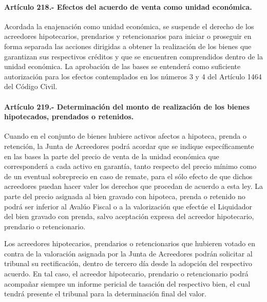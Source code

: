 \documentclass[
]{book}
\begin{document}
\hypertarget{artuxedculo-218.--efectos-del-acuerdo-de-venta-como-unidad-econuxf3mica.}{%
\paragraph*{Artículo 218.- Efectos del acuerdo de venta como unidad económica.}\label{artuxedculo-218.--efectos-del-acuerdo-de-venta-como-unidad-econuxf3mica.}}

Acordada la enajenación como unidad económica, se suspende el derecho de los acreedores hipotecarios, prendarios y retencionarios para iniciar o proseguir en forma separada las acciones dirigidas a obtener la realización de los bienes que garantizan sus respectivos créditos y que se encuentren comprendidos dentro de la unidad económica. La aprobación de las bases se entenderá como suficiente autorización para los efectos contemplados en los números 3 y 4 del Artículo 1464 del Código Civil.

\hypertarget{artuxedculo-219.--determinaciuxf3n-del-monto-de-realizaciuxf3n-de-los-bienes-hipotecados-prendados-o-retenidos.}{%
\paragraph*{Artículo 219.- Determinación del monto de realización de los bienes hipotecados, prendados o retenidos.}\label{artuxedculo-219.--determinaciuxf3n-del-monto-de-realizaciuxf3n-de-los-bienes-hipotecados-prendados-o-retenidos.}}

Cuando en el conjunto de bienes hubiere activos afectos a hipoteca, prenda o retención, la Junta de Acreedores podrá acordar que se indique específicamente en las bases la parte del precio de venta de la unidad económica que corresponderá a cada activo en garantía, tanto respecto del precio mínimo como de un eventual sobreprecio en caso de remate, para el sólo efecto de que dichos acreedores puedan hacer valer los derechos que procedan de acuerdo a esta ley. La parte del precio asignada al bien gravado con hipoteca, prenda o retenido no podrá ser inferior al Avalúo Fiscal o a la valorización que efectúe el Liquidador del bien gravado con prenda, salvo aceptación expresa del acreedor hipotecario, prendario o retencionario.

Los acreedores hipotecarios, prendarios o retencionarios que hubieren votado en contra de la valoración asignada por la Junta de Acreedores podrán solicitar al tribunal su rectificación, dentro de tercero día desde la adopción del respectivo acuerdo. En tal caso, el acreedor hipotecario, prendario o retencionario podrá acompañar siempre un informe pericial de tasación del respectivo bien, el cual tendrá presente el tribunal para la determinación final del valor.
\end{document}
